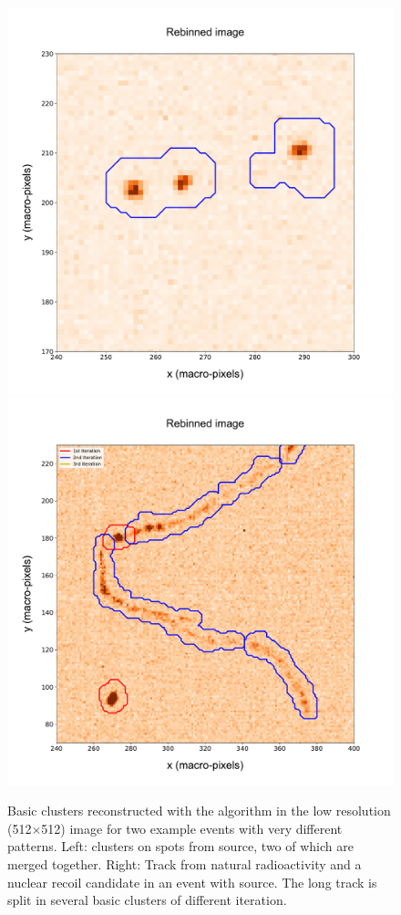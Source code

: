 \begin{figure}[ht]
  \begin{center}
     \includegraphics[width=0.49\linewidth]{figures/pic_run01843_ev93_2nd_3D_paper}
      \includegraphics[width=0.49\linewidth]{figures/pic_run02317_ev8_all_3D_paper}
      \caption{Basic clusters reconstructed with the \idbscan
    algorithm in the low resolution (512$\times$512) image for two
    example events with very different patterns. Left: clusters on
    spots from \fe source, two of which are merged together. Right:
    Track from natural radioactivity and a nuclear recoil candidate in
    an event with \ambe source. The long track is split in several
    basic clusters of different \idbscan
    iteration. \label{fig:basic_clusters}}
  \end{center}
\end{figure}
